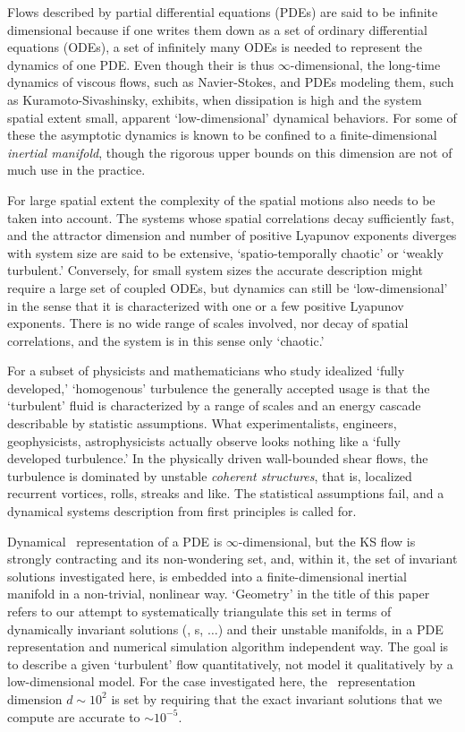 {
Flows described by partial differential equations (PDEs) are
said to be infinite dimensional because if one writes them
down as a set of ordinary differential equations (ODEs), a set
of infinitely many ODEs is needed to represent the dynamics
of one PDE. Even though their {\statesp} is thus
$\infty$-dimensional, the long-\-time dynamics of viscous
flows, such as Navier-Stokes, and PDEs modeling them, such as
Kuramoto-Sivashinsky, exhibits, when dissipation is high and
the system spatial extent small, apparent `low-dimensional'
dynamical behaviors. For some of these the asymptotic
dynamics is known to be confined to a finite-\-dimensional
{\em inertial manifold}, though the rigorous upper bounds on
this dimension are not of much use in the practice.

For large spatial extent the complexity of the spatial
motions also needs to be taken into account. The systems
whose spatial correlations decay sufficiently fast, and the
attractor dimension and number of positive Lyapunov exponents
diverges with system size are said
to be extensive, `spatio-temporally chaotic' or `weakly
turbulent.' Conversely, for small system sizes the accurate
description might require a large set of coupled
ODEs, but dynamics can still be `low-dimensional' in the
sense that it is characterized with one or a few positive
Lyapunov exponents. There is no wide range of scales
involved, nor decay of spatial correlations, and the system
is in this sense only `chaotic.'

For a subset of physicists and mathematicians who study
idealized `fully developed,' `homogenous' turbulence the
generally accepted usage is that the `turbulent' fluid is
characterized by a range of scales and an energy cascade
describable by statistic assumptions. What experimentalists,
engineers, geophysicists, astrophysicists actually observe
looks nothing like a `fully developed turbulence.' In the
physically driven wall-bounded shear flows, the turbulence is
dominated by unstable \emph{coherent structures}, that is,
localized recurrent vortices, rolls, streaks and like. The
statistical assumptions fail, and a dynamical systems
description from first principles is called for.
} %

Dynamical \statesp\ representation of a PDE is
$\infty$-dimensional, but the KS flow is strongly contracting
and its non-wondering set, and, within it, the set of
invariant solutions investigated here, is embedded into a
finite-dimensional inertial manifold in a
non-trivial, nonlinear way. `Geometry' in the title of this
paper refers to our attempt to systematically triangulate
this set in terms of dynamically invariant solutions (\eqva,
\po s, $\ldots$) and their unstable manifolds, in a PDE
representation and numerical simulation algorithm independent
way. The goal is to describe a given `turbulent' flow
quantitatively, not model it qualitatively by a
low-dimensional model. For the case investigated here, the
\statesp\ representation dimension $d \sim 10^2$ is set by
requiring that the exact invariant solutions that we compute
are accurate to $\sim 10^{-5}$.

